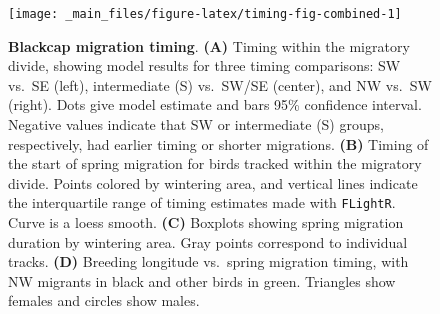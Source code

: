 \documentclass[a4paper, nobind]{templates/ociamthesis}
\begin{document}
\begin{figure}
\texttt{[image: \_main\_files/figure-latex/timing-fig-combined-1]} \caption{\textbf{Blackcap migration timing}. \textbf{(A)} Timing within the migratory divide, showing model results for three timing comparisons: SW vs.~SE (left), intermediate (S) vs.~SW/SE (center), and NW vs.~SW (right). Dots give model estimate and bars 95\% confidence interval. Negative values indicate that SW or intermediate (S) groups, respectively, had earlier timing or shorter migrations. \textbf{(B)} Timing of the start of spring migration for birds tracked within the migratory divide. Points colored by wintering area, and vertical lines indicate the interquartile range of timing estimates made with \texttt{FLightR}. Curve is a loess smooth. \textbf{(C)} Boxplots showing spring migration duration by wintering area. Gray points correspond to individual tracks. \textbf{(D)} Breeding longitude vs.~spring migration timing, with NW migrants in black and other birds in green. Triangles show females and circles show males.}\label{fig:timing-fig-combined}
\end{figure}
\end{document}
